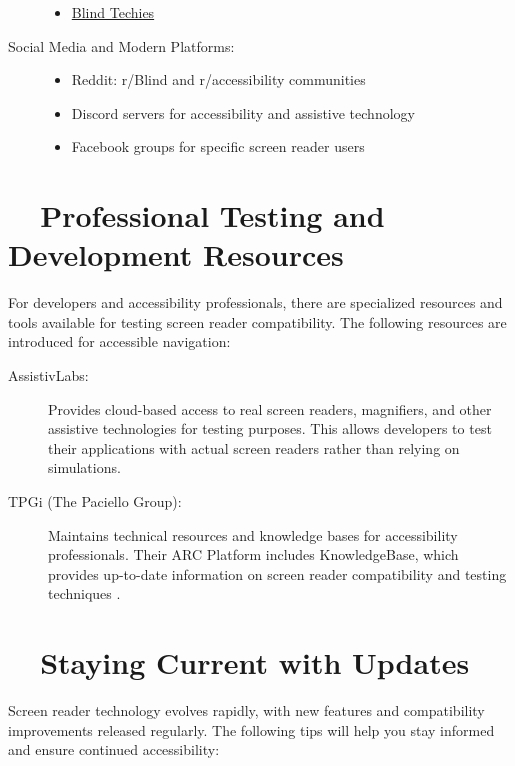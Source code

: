 \begin{description}
\begin{itemize}
		      \item \href{https://groups.io/g/blind-techies/}{Blind Techies}
	      \end{itemize}
	\item[Social Media and Modern Platforms:]
	      \begin{itemize}
		      \item Reddit: r/Blind and r/\gls{accessibility} communities
		      \item Discord servers for accessibility and assistive technology
		      \item Facebook groups for specific screen reader users
	      \end{itemize}
\end{description}

\section{~~Professional Testing and Development Resources}
\label{app1:testing}
For developers and accessibility professionals, there are specialized resources and tools available for testing screen reader compatibility. The following resources are introduced for accessible \gls{navigation}:

\begin{description}
	\item[AssistivLabs:] Provides cloud-based access to real screen readers, magnifiers, and other assistive technologies for testing purposes. This allows developers to test their applications with actual screen readers rather than relying on simulations.
	\item[TPGi (The Paciello Group):] Maintains technical resources and knowledge bases for accessibility professionals. Their ARC Platform includes KnowledgeBase, which provides up-to-date information on screen reader compatibility and testing techniques \cite{TPGiARC}.
\end{description}

\section{~~Staying Current with Updates}
\label{app1:updates}
Screen reader technology evolves rapidly, with new features and compatibility improvements released regularly. The following tips will help you stay informed and ensure continued accessibility:

